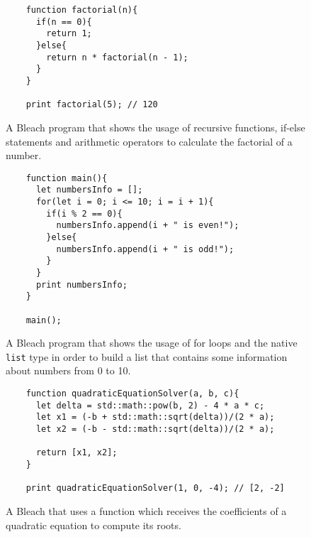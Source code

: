 \begin{figure}
    \centering
    \begin{lstlisting}
    function factorial(n){
      if(n == 0){
        return 1;
      }else{
        return n * factorial(n - 1);
      }
    }
    
    print factorial(5); // 120
    \end{lstlisting}
    \caption{A Bleach program that shows the usage of recursive functions, if-else statements and arithmetic operators to calculate the factorial of a number.}
\end{figure}

\begin{figure}
    \centering
    \begin{lstlisting}
    function main(){
      let numbersInfo = [];
      for(let i = 0; i <= 10; i = i + 1){
        if(i % 2 == 0){
          numbersInfo.append(i + " is even!");
        }else{
          numbersInfo.append(i + " is odd!");
        }
      }
      print numbersInfo;
    }
    
    main();
    \end{lstlisting}
    \caption{A Bleach program that shows the usage of for loops and the native \texttt{list} type in order to build a list that contains some information about numbers from 0 to 10.}
\end{figure}

\begin{figure}
    \centering
    \begin{lstlisting}
    function quadraticEquationSolver(a, b, c){
      let delta = std::math::pow(b, 2) - 4 * a * c;
      let x1 = (-b + std::math::sqrt(delta))/(2 * a);
      let x2 = (-b - std::math::sqrt(delta))/(2 * a);
    
      return [x1, x2];
    }
    
    print quadraticEquationSolver(1, 0, -4); // [2, -2]
    \end{lstlisting}
    \caption{A Bleach that uses a function which receives the coefficients of a quadratic equation to compute its roots.}
\end{figure}

